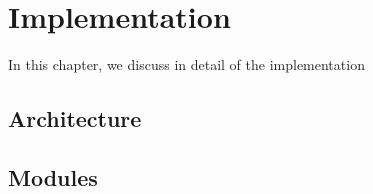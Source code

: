 \chapter{Implementation}
\label{ch:implementation}
\newpage

In this chapter, we discuss in detail of the implementation 
\section {Architecture}
\section {Modules} 













